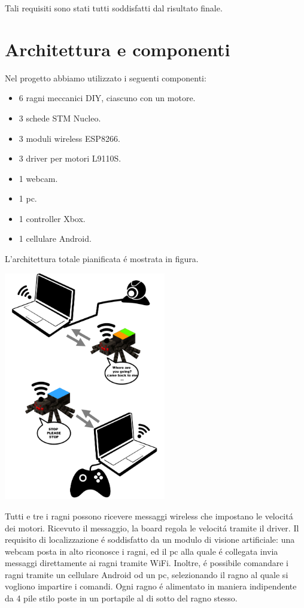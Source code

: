 \documentclass [11pt ,a4paper ,twoside ]{article}
\begin{document}
Tali requisiti sono stati tutti soddisfatti dal risultato finale.

\section{Architettura e componenti}

Nel progetto abbiamo utilizzato i seguenti componenti:
\begin{itemize}
\item 6 ragni meccanici DIY, ciascuno con un motore.
\item 3 schede STM Nucleo.
\item 3 moduli wireless ESP8266.
\item 3 driver per motori L9110S.
\item 1 webcam.
\item 1 pc.
\item 1 controller Xbox.
\item 1 cellulare Android.
\end{itemize}

L'architettura totale pianificata \'e mostrata in figura. 

\begin{center}
\includegraphics[keepaspectratio, width=200pt]{Images/Infographic.png}
\end{center}

Tutti e tre i ragni possono ricevere messaggi wireless che impostano le velocit\'a dei motori. Ricevuto il messaggio, la board regola le velocit\'a tramite il driver. Il requisito di localizzazione \'e soddisfatto da un modulo di visione artificiale: una webcam posta in alto riconosce i ragni, ed il pc alla quale \'e collegata invia messaggi direttamente ai ragni tramite WiFi. Inoltre, \'e possibile comandare i ragni tramite un cellulare Android od un pc, selezionando il ragno al quale si vogliono impartire i comandi. Ogni ragno \'e alimentato in maniera indipendente da 4 pile stilo poste in un portapile al di sotto del ragno stesso.
\end{document}
